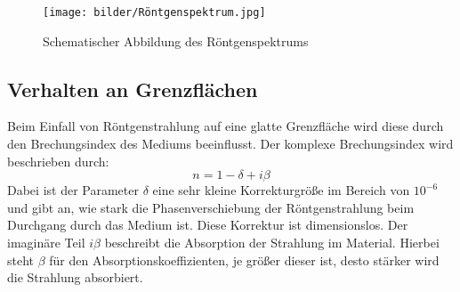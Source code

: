 \begin{figure}
    \texttt{[image: bilder/Röntgenspektrum.jpg]}
    \caption{Schematischer Abbildung des Röntgenspektrums}
    \label{fig:Abbildung 1}
\end{figure}

\subsection{Verhalten an Grenzflächen}
Beim Einfall von Röntgenstrahlung auf eine glatte Grenzfläche wird diese durch den Brechungsindex des Mediums beeinflusst.
Der komplexe Brechungsindex wird beschrieben durch:
\begin{equation}
    n=1-\delta+i\beta
\end{equation}
Dabei ist der Parameter \(\delta\) eine sehr kleine Korrekturgröße im Bereich von $10^{-6}$
und gibt an, wie stark die Phasenverschiebung der Röntgenstrahlung beim Durchgang durch das Medium ist.
Diese Korrektur ist dimensionslos. Der imaginäre Teil \(i\beta\) beschreibt die Absorption der Strahlung im Material.
Hierbei steht \(\beta\) für den Absorptionskoeffizienten, je größer dieser ist, desto stärker wird die Strahlung absorbiert.

